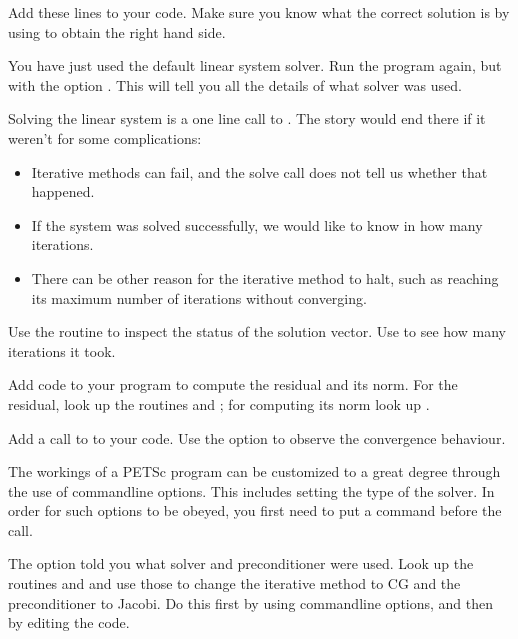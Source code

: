 \begin{exercise}
  Add these lines to your code. Make sure you know what the correct
  solution is by using  to obtain the right hand side.
\end{exercise}

You have just used the default linear system solver. Run the program
again, but with the option . This will tell you all the
details of what solver was used.

Solving the linear system is a one line call to . The
story would end there if it weren't for some complications:
\begin{itemize}
\item Iterative methods can fail, and the solve call does not tell us
  whether that happened.
\item If the system was solved successfully, we would like to know in
  how many iterations.
\item There can be other reason for the iterative method to halt, such
  as reaching its maximum number of iterations without converging.
\end{itemize}

\begin{exercise}
  Use the
  routine  to inspect the status of the
  solution vector. Use  to see how many
  iterations it took.
\end{exercise}

\begin{exercise}
  Add code to your program to compute the residual and its norm. For
  the residual, look up the routines  and ;
  for computing its norm look up .
\end{exercise}

\begin{exercise}
  Add a call to  to your code. Use the option
   to observe the convergence behaviour.
\end{exercise}

The workings of a PETSc program can be customized to a great degree
through the use of commandline options. This includes setting the type
of the solver. In order for such options to be obeyed, you first need
to put a command  before the  call.

\begin{exercise}
  The  option told you what solver and preconditioner
  were used. Look up the routines  and  and
  use those to change the iterative method to CG and the
  preconditioner to Jacobi. Do this first by using commandline
  options, and then by editing the code.
\end{exercise}

